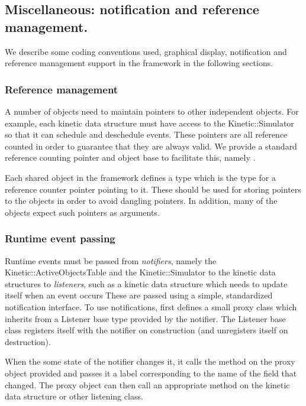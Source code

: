 \subsection{Miscellaneous: notification and reference management.}
\label{sec:misc}

We describe some coding conventions used, graphical display,
notification and reference management support in the framework in the
following sections.


\subsubsection{Reference management}

A number of objects need to maintain pointers to other independent
objects. For example, each kinetic data structure must have access to
the Kinetic::Simulator so that it can schedule and deschedule events. These
pointers are all reference counted in order to guarantee that they are
always valid. We provide a standard reference counting pointer and
object base to facilitate this, namely .

Each shared object in the framework defines a type  which is the
type for a reference counter pointer pointing to it. These should be
used for storing pointers to the objects in order to avoid dangling
pointers. In addition, many of the objects expect such pointers as
arguments.

\subsubsection{Runtime event passing}

Runtime events must be passed from \textit{notifiers}, namely the
Kinetic::ActiveObjectsTable and the Kinetic::Simulator to the kinetic data
structures to \textit{listeners}, such as a kinetic data structure
which needs to update itself when an event occurs These are passed
using a simple, standardized notification interface. To use
notifications, first defines a small proxy class which inherits from a
Listener base type provided by the notifier. The Listener
base class registers itself with the notifier on construction (and
unregisters itself on destruction).

When the some state of the notifier changes it, it calls the
 method on the proxy object provided and passes
it a label corresponding to the name of the field that changed. The
proxy object can then call an appropriate method on the kinetic data
structure or other listening class.

